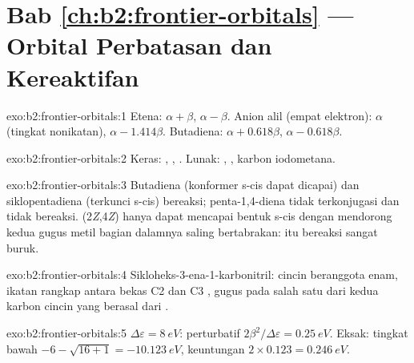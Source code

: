\section*{Bab \ref{ch:b2:frontier-orbitals} --- Orbital Perbatasan dan Kereaktifan}

\begin{solution}{exo:b2:frontier-orbitals:1}
Etena:  $\alpha + \beta$,  $\alpha - \beta$. Anion alil (empat elektron):  $\alpha$
(tingkat nonikatan),  $\alpha - 1.414\beta$. Butadiena:  $\alpha + 0.618\beta$,  $\alpha -
0.618\beta$.
\end{solution}

\begin{solution}{exo:b2:frontier-orbitals:2}
Keras: , , . Lunak: , , karbon iodometana.
\end{solution}

\begin{solution}{exo:b2:frontier-orbitals:3}
Butadiena (konformer s-cis dapat dicapai) dan siklopentadiena (terkunci
s-cis) bereaksi; penta-1,4-diena tidak terkonjugasi dan tidak bereaksi.
 (2\textit{Z},4\textit{Z}) hanya dapat mencapai bentuk s-cis dengan
mendorong kedua gugus metil bagian dalamnya saling bertabrakan:  itu
bereaksi sangat buruk.
\end{solution}

\begin{solution}{exo:b2:frontier-orbitals:4}
Sikloheks-3-ena-1-karbonitril: cincin beranggota enam, ikatan rangkap antara
bekas C2 dan C3 , gugus  pada salah satu dari kedua karbon
cincin yang berasal dari .
\end{solution}

\begin{solution}{exo:b2:frontier-orbitals:5}
$\Delta\varepsilon = \qty{8}{eV}$: perturbatif $2\beta^2/\Delta\varepsilon = \qty{0.25}{eV}$. Eksak: tingkat
bawah $-6 - \sqrt{16 + 1} = \qty{-10.123}{eV}$, keuntungan $2 \times 0.123 = \qty{0.246}{eV}$.
\end{solution}

